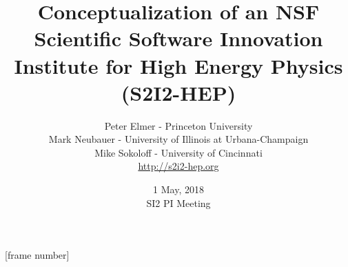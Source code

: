 \documentclass{beamer}
\title{Conceptualization of an NSF Scientific Software Innovation Institute for High Energy Physics (S2I2-HEP)}
\author{Peter Elmer - Princeton University \\
        Mark Neubauer - University of Illinois at Urbana-Champaign \\
        Mike Sokoloff - University of Cincinnati \\  
        \url{http://s2i2-hep.org}}
\date{1 May, 2018 \\ SI2 PI Meeting}
\begin{document}
\maketitle

%
%

[frame number]













%
%


%



%







\end{document}

